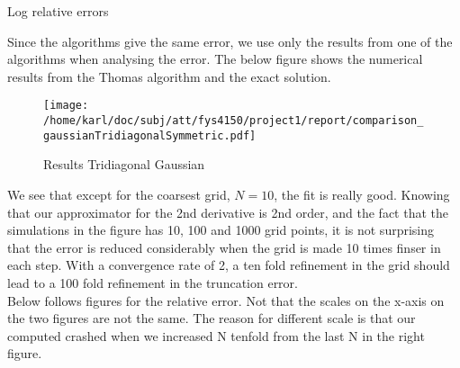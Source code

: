 \documentclass{article}
\begin{document}
\begin{table}[H]
	\begin{minipage}{.32\textwidth} %
		
	\end{minipage}\hfill
	\begin{minipage}{.32\textwidth} %
		
	\end{minipage}\hfill
	\begin{minipage}{.32\textwidth}
		
	\end{minipage}\hfill
	\caption{Log relative errors}
	\label{table: logErrors}
\end{table}

Since the algorithms give the same error, we use only the results from one of the algorithms when analysing the error. The below figure shows the numerical results from the Thomas algorithm and the exact solution.

\begin{figure}[H]
	\centering
	\texttt{[image: /home/karl/doc/subj/att/fys4150/project1/report/comparison\_gaussianTridiagonalSymmetric.pdf]}
	\caption{Results Tridiagonal Gaussian}
	\label{fig:comparisongaussiantridiagonalsymmetric}
\end{figure}

We see that except for the coarsest grid, $N=10$, the fit is really good. Knowing that our approximator for the 2nd derivative is 2nd order, and the fact that the simulations in the figure has 10, 100 and 1000 grid points, it is not surprising that the error is reduced considerably when the grid is made 10 times finser in each step. With a convergence rate of 2, a ten fold refinement in the grid should lead to a 100 fold refinement in the truncation error.\\

Below follows figures for the relative error. Not that the scales on the x-axis on the two figures are not the same. The reason for different scale is that our computed crashed when we increased N tenfold from the last N in the right figure.\\
\end{document}

